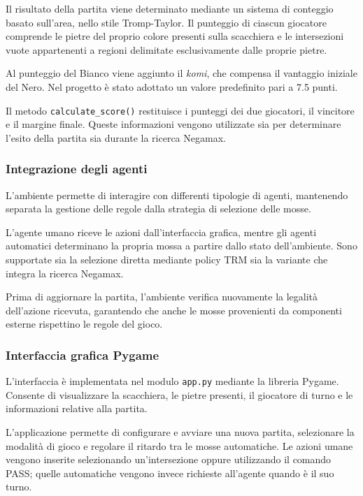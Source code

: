 Il risultato della partita viene determinato mediante un sistema di conteggio basato sull'area, nello stile Tromp-Taylor. Il punteggio di ciascun giocatore comprende le pietre del proprio colore presenti sulla scacchiera e le intersezioni vuote appartenenti a regioni delimitate esclusivamente dalle proprie pietre.

Al punteggio del Bianco viene aggiunto il \textit{komi}, che compensa il vantaggio iniziale del Nero. Nel progetto è stato adottato un valore predefinito pari a 7.5 punti.

Il metodo \texttt{calculate\_score()} restituisce i punteggi dei due giocatori, il vincitore e il margine finale. Queste informazioni vengono utilizzate sia per determinare l'esito della partita sia durante la ricerca Negamax.

\subsubsection{Integrazione degli agenti}

L'ambiente permette di interagire con differenti tipologie di agenti, mantenendo separata la gestione delle regole dalla strategia di selezione delle mosse.

L'agente umano riceve le azioni dall'interfaccia grafica, mentre gli agenti automatici determinano la propria mossa a partire dallo stato dell'ambiente. Sono supportate sia la selezione diretta mediante policy TRM sia la variante che integra la ricerca Negamax.

Prima di aggiornare la partita, l'ambiente verifica nuovamente la legalità dell'azione ricevuta, garantendo che anche le mosse provenienti da componenti esterne rispettino le regole del gioco.

\subsubsection{Interfaccia grafica Pygame}

L'interfaccia è implementata nel modulo \texttt{app.py} mediante la libreria Pygame. Consente di visualizzare la scacchiera, le pietre presenti, il giocatore di turno e le informazioni relative alla partita.

L'applicazione permette di configurare e avviare una nuova partita, selezionare la modalità di gioco e regolare il ritardo tra le mosse automatiche. Le azioni umane vengono inserite selezionando un'intersezione oppure utilizzando il comando PASS; quelle automatiche vengono invece richieste all'agente quando è il suo turno.

